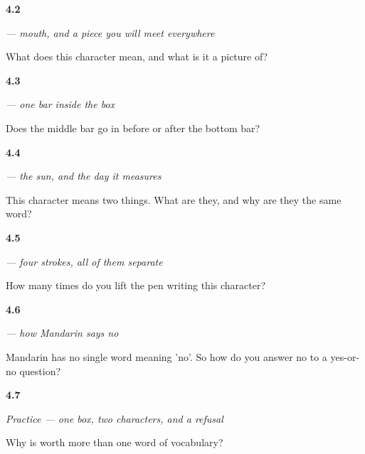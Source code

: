 \noindent\begin{minipage}[t]{\linewidth}
\raggedright
\hypertarget{review-ZH-C04-kou-meaning}{\textbf{4.2}} \emph{ — mouth, and a piece you will meet everywhere}\par
\small What does this character mean, and what is it a picture of?
\end{minipage}\par\medskip

\noindent\begin{minipage}[t]{\linewidth}
\raggedright
\hypertarget{review-ZH-W04-ri-order}{\textbf{4.3}} \emph{ — one bar inside the box}\par
\small Does the middle bar go in before or after the bottom bar?
\end{minipage}\par\medskip

\noindent\begin{minipage}[t]{\linewidth}
\raggedright
\hypertarget{review-ZH-C04-ri-two}{\textbf{4.4}} \emph{ — the sun, and the day it measures}\par
\small This character means two things. What are they, and why are they the same word?
\end{minipage}\par\medskip

\noindent\begin{minipage}[t]{\linewidth}
\raggedright
\hypertarget{review-ZH-W04-bu-lifts}{\textbf{4.5}} \emph{ — four strokes, all of them separate}\par
\small How many times do you lift the pen writing this character?
\end{minipage}\par\medskip

\noindent\begin{minipage}[t]{\linewidth}
\raggedright
\hypertarget{review-ZH-C04-bu-no}{\textbf{4.6}} \emph{ — how Mandarin says no}\par
\small Mandarin has no single word meaning 'no'. So how do you answer no to a yes-or-no question?
\end{minipage}\par\medskip

\noindent\begin{minipage}[t]{\linewidth}
\raggedright
\hypertarget{review-ZH-C04-practice-double}{\textbf{4.7}} \emph{Practice — one box, two characters, and a refusal}\par
\small Why is  worth more than one word of vocabulary?
\end{minipage}\par\medskip

